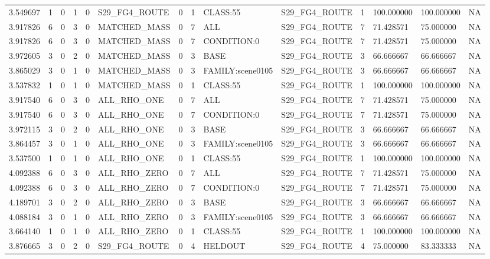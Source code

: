 \begin{tabular}{llllllllllllll}
3.549697 & 1 & 0 & 1 & 0 & S29\_FG4\_ROUTE & 0 & 1 & CLASS:55 & S29\_FG4\_ROUTE & 1 & 100.000000 & 100.000000 & NA \\
3.917826 & 6 & 0 & 3 & 0 & MATCHED\_MASS & 0 & 7 & ALL & S29\_FG4\_ROUTE & 7 & 71.428571 & 75.000000 & NA \\
3.917826 & 6 & 0 & 3 & 0 & MATCHED\_MASS & 0 & 7 & CONDITION:0 & S29\_FG4\_ROUTE & 7 & 71.428571 & 75.000000 & NA \\
3.972605 & 3 & 0 & 2 & 0 & MATCHED\_MASS & 0 & 3 & BASE & S29\_FG4\_ROUTE & 3 & 66.666667 & 66.666667 & NA \\
3.865029 & 3 & 0 & 1 & 0 & MATCHED\_MASS & 0 & 3 & FAMILY:scene0105 & S29\_FG4\_ROUTE & 3 & 66.666667 & 66.666667 & NA \\
3.537832 & 1 & 0 & 1 & 0 & MATCHED\_MASS & 0 & 1 & CLASS:55 & S29\_FG4\_ROUTE & 1 & 100.000000 & 100.000000 & NA \\
3.917540 & 6 & 0 & 3 & 0 & ALL\_RHO\_ONE & 0 & 7 & ALL & S29\_FG4\_ROUTE & 7 & 71.428571 & 75.000000 & NA \\
3.917540 & 6 & 0 & 3 & 0 & ALL\_RHO\_ONE & 0 & 7 & CONDITION:0 & S29\_FG4\_ROUTE & 7 & 71.428571 & 75.000000 & NA \\
3.972115 & 3 & 0 & 2 & 0 & ALL\_RHO\_ONE & 0 & 3 & BASE & S29\_FG4\_ROUTE & 3 & 66.666667 & 66.666667 & NA \\
3.864457 & 3 & 0 & 1 & 0 & ALL\_RHO\_ONE & 0 & 3 & FAMILY:scene0105 & S29\_FG4\_ROUTE & 3 & 66.666667 & 66.666667 & NA \\
3.537500 & 1 & 0 & 1 & 0 & ALL\_RHO\_ONE & 0 & 1 & CLASS:55 & S29\_FG4\_ROUTE & 1 & 100.000000 & 100.000000 & NA \\
4.092388 & 6 & 0 & 3 & 0 & ALL\_RHO\_ZERO & 0 & 7 & ALL & S29\_FG4\_ROUTE & 7 & 71.428571 & 75.000000 & NA \\
4.092388 & 6 & 0 & 3 & 0 & ALL\_RHO\_ZERO & 0 & 7 & CONDITION:0 & S29\_FG4\_ROUTE & 7 & 71.428571 & 75.000000 & NA \\
4.189701 & 3 & 0 & 2 & 0 & ALL\_RHO\_ZERO & 0 & 3 & BASE & S29\_FG4\_ROUTE & 3 & 66.666667 & 66.666667 & NA \\
4.088184 & 3 & 0 & 1 & 0 & ALL\_RHO\_ZERO & 0 & 3 & FAMILY:scene0105 & S29\_FG4\_ROUTE & 3 & 66.666667 & 66.666667 & NA \\
3.664140 & 1 & 0 & 1 & 0 & ALL\_RHO\_ZERO & 0 & 1 & CLASS:55 & S29\_FG4\_ROUTE & 1 & 100.000000 & 100.000000 & NA \\
3.876665 & 3 & 0 & 2 & 0 & S29\_FG4\_ROUTE & 0 & 4 & HELDOUT & S29\_FG4\_ROUTE & 4 & 75.000000 & 83.333333 & NA \\

\end{tabular}
